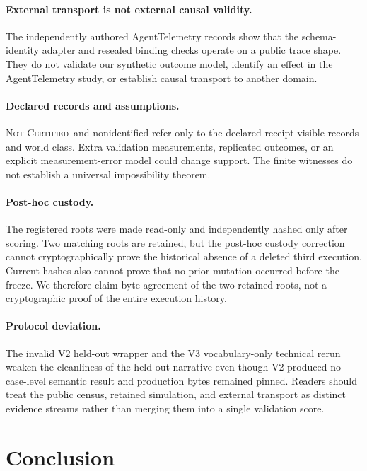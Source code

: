 \documentclass{article}
\newcommand{\notcert}{\textsc{Not-Certified}\xspace}
\begin{document}
\paragraph{External transport is not external causal validity.}
The independently authored AgentTelemetry records show that the schema-identity adapter and resealed binding checks operate on a public trace shape. They do not validate our synthetic outcome model, identify an effect in the AgentTelemetry study, or establish causal transport to another domain.

\paragraph{Declared records and assumptions.}
\notcert\ and nonidentified refer only to the declared receipt-visible records and world class. Extra validation measurements, replicated outcomes, or an explicit measurement-error model could change support. The finite witnesses do not establish a universal impossibility theorem.

\paragraph{Post-hoc custody.}
The registered roots were made read-only and independently hashed only after scoring. Two matching roots are retained, but the post-hoc custody correction cannot cryptographically prove the historical absence of a deleted third execution. Current hashes also cannot prove that no prior mutation occurred before the freeze. We therefore claim byte agreement of the two retained roots, not a cryptographic proof of the entire execution history.

\paragraph{Protocol deviation.}
The invalid V2 held-out wrapper and the V3 vocabulary-only technical rerun weaken the cleanliness of the held-out narrative even though V2 produced no case-level semantic result and production bytes remained pinned. Readers should treat the public census, retained simulation, and external transport as distinct evidence streams rather than merging them into a single validation score.

\section{Conclusion}
\label{sec:conclusion}
\end{document}

